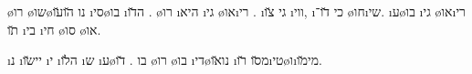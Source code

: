 \o{רו} \o{שו}\o{נו} \u{הו}\u{עו}  \i{סי}\o{בו} \i{ה}\u{דו}  \dinozaurim. \o{רו}  \i{היא} \i{גי} \o{או}\i{רי} . \i{גי}     \u{צו} \i{ווי},  \i{כי}  \u{דו}־      \o{חו}\i{שי}. \i{ע}\o{בו} \i{גי} \o{או}\i{רי} \u{תו} \i{בי} \i{חי}  \o{סו} \o{או}.

 \i{נ} \i{יי}\u{שו}  \i{י} \i{ה}\u{לו} \i{ש}  \i{ע}\o{בו} \dinozaurim. \u{דו} \o{רו}  \o{בו}  \i{די}\o{נו}\u{או} \i{מ}\u{סו} \u{רו}\i{טי}\o{ו}\i{מי}\u{מו}.


